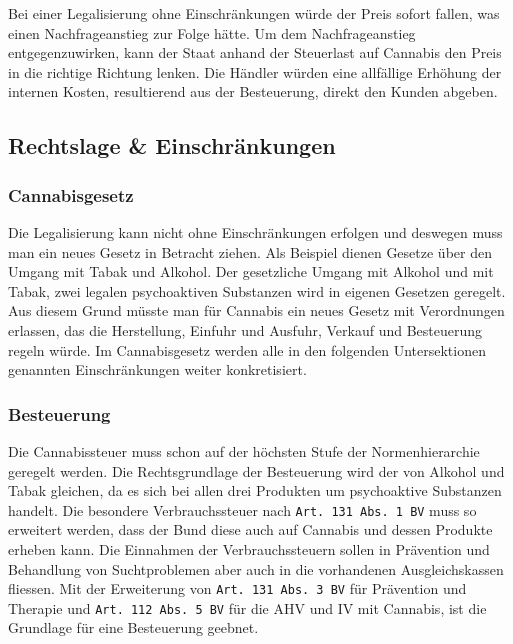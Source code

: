 \documentclass[../main.tex]{subfiles}
\begin{document}
	 \noindent	
	 Bei einer Legalisierung ohne Einschränkungen würde der Preis sofort fallen, was einen Nachfrageanstieg zur Folge hätte.
	 Um dem Nachfrageanstieg entgegenzuwirken, kann der Staat anhand der Steuerlast auf Cannabis den Preis in die richtige Richtung lenken.
	 Die Händler würden eine allfällige Erhöhung der internen Kosten, resultierend aus der Besteuerung, direkt den Kunden abgeben.
	
	 
	 \subsection{Rechtslage \& Einschränkungen}
	 
	 \subsubsection{Cannabisgesetz}
	 Die Legalisierung kann nicht ohne Einschränkungen erfolgen und deswegen muss man ein neues Gesetz in Betracht ziehen.
	 Als Beispiel dienen Gesetze über den Umgang mit Tabak und Alkohol.
	 Der gesetzliche Umgang mit Alkohol und mit Tabak, zwei legalen psychoaktiven Substanzen wird in eigenen Gesetzen geregelt. 
	 Aus diesem Grund müsste man für Cannabis ein neues Gesetz mit Verordnungen erlassen, das die Herstellung, Einfuhr und Ausfuhr, Verkauf und Besteuerung regeln würde.	 
	 Im Cannabisgesetz werden alle in den folgenden Untersektionen genannten Einschränkungen weiter konkretisiert.
	 
	 \subsubsection{Besteuerung}
	 Die Cannabissteuer muss schon auf der höchsten Stufe der Normenhierarchie geregelt werden. 
	 Die Rechtsgrundlage der Besteuerung wird der von Alkohol und Tabak gleichen, da es sich bei allen drei Produkten um psychoaktive Substanzen handelt.
	 Die besondere Verbrauchssteuer nach \texttt{Art. 131 Abs. 1 BV} muss so erweitert werden, dass der Bund diese auch auf Cannabis und dessen Produkte erheben kann.
	 Die Einnahmen der Verbrauchssteuern sollen in Prävention und Behandlung von Suchtproblemen aber auch in die vorhandenen Ausgleichskassen fliessen.
	 Mit der Erweiterung von \texttt{Art. 131 Abs. 3 BV} für Prävention und Therapie und \texttt{Art. 112 Abs. 5 BV} für die AHV und IV mit Cannabis, ist die Grundlage für eine Besteuerung geebnet.\\
	 
\end{document}
